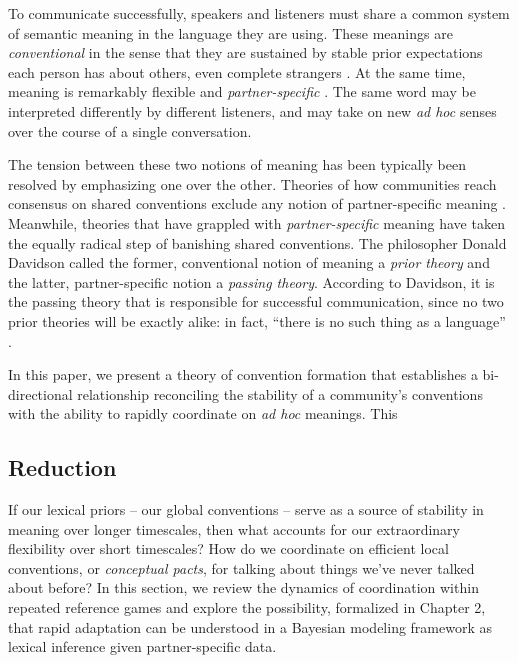 

To communicate successfully, speakers and listeners must share a common system of semantic meaning in the language they are using. 
These meanings are \emph{conventional} in the sense that they are sustained by stable prior expectations each person has about others, even complete strangers \cite{lewis_convention:_1969, hawkins2019emergence}.
At the same time, meaning is remarkably flexible and \emph{partner-specific} \cite{clark_using_1996}.
The same word may be interpreted differently by different listeners, and may take on new \emph{ad hoc} senses over the course of a single conversation. 

The tension between these two notions of meaning has been typically been resolved by emphasizing one over the other.
Theories of how communities reach consensus on shared conventions exclude any notion of partner-specific meaning \cite{Steels}.
Meanwhile, theories that have grappled with \emph{partner-specific} meaning have taken the equally radical step of banishing shared conventions.
The philosopher Donald Davidson called the former, conventional notion of meaning a \emph{prior theory} and the latter, partner-specific notion a \emph{passing theory}. 
According to Davidson, it is the passing theory that is responsible for successful communication, since no two prior theories will be exactly alike: in fact, ``there is no such thing as a language'' \cite[p. 174]{davidson_nice_1986}.

In this paper, we present a theory of convention formation that establishes a bi-directional relationship reconciling the stability of a community's conventions with the ability to rapidly coordinate on \emph{ad hoc} meanings. 
This 

\subsection{Reduction}

If our lexical priors -- our global conventions -- serve as a source of stability in meaning over longer timescales, then what accounts for our extraordinary flexibility  over short timescales? How do we coordinate on efficient local conventions, or \emph{conceptual pacts}, for talking about things we've never talked about before? In this section, we review the dynamics of coordination within repeated reference games and explore the possibility, formalized in Chapter 2, that rapid adaptation can be understood in a Bayesian modeling framework as lexical inference given partner-specific data.%

